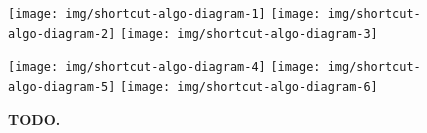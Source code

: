 \begin{figure*}

\centering
\texttt{[image: img/shortcut-algo-diagram-1]}
\texttt{[image: img/shortcut-algo-diagram-2]}
\texttt{[image: img/shortcut-algo-diagram-3]}

\texttt{[image: img/shortcut-algo-diagram-4]}
\texttt{[image: img/shortcut-algo-diagram-5]}
\texttt{[image: img/shortcut-algo-diagram-6]}

\caption{\textbf{TODO.}}
\label{fig:shortcut-algo-diagram}

\end{figure*}
